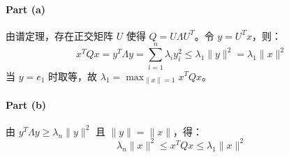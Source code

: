 \paragraph{Part (a)}  
由谱定理，存在正交矩阵 \(U\) 使得 \(Q = U\Lambda U^T\)。令 \(y = U^T x\)，则：
\[
x^T Qx = y^T \Lambda y = \sum_{i=1}^n \lambda_i y_i^2 \leq \lambda_1 \|y\|^2 = \lambda_1 \|x\|^2
\]
当 \(y = e_1\) 时取等，故 \(\lambda_1 = \max_{\|x\|=1} x^T Qx\)。

\paragraph{Part (b)}  
由 \(y^T \Lambda y \geq \lambda_n \|y\|^2\) 且 \(\|y\| = \|x\|\)，得：
\[
\lambda_n \|x\|^2 \leq x^T Qx \leq \lambda_1 \|x\|^2
\]